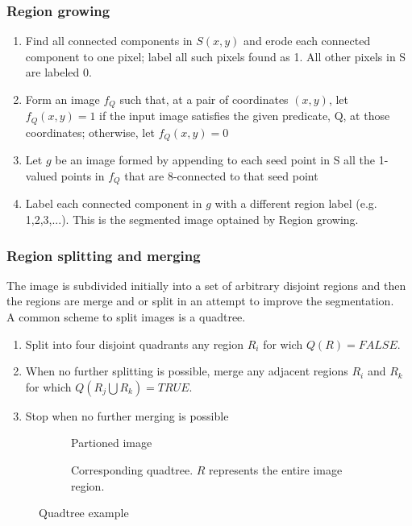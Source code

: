 \subsubsection{Region growing}
\begin{enumerate}
\item Find all connected components in $S(x,y)$ and erode each connected component to one pixel; label all such pixels found as 1. All other pixels in S are labeled 0.
\item Form an image $f_Q$ such that, at a pair of coordinates $(x,y)$, let $f_Q(x,y)=1$ if the input image satisfies the given predicate, Q, at those coordinates; otherwise, let $f_Q(x,y)=0$
\item Let $g$ be an image formed by appending to each seed point in S all the 1-valued points in $f_Q$ that are 8-connected to that seed point
\item Label each connected component in $g$ with a different region label (e.g. 1,2,3,...). This is the segmented image optained by Region growing.
\end{enumerate}
\subsubsection{Region splitting and merging}
The image is subdivided initially into a set of arbitrary disjoint regions and then the regions are merge and or split in an attempt to improve the segmentation.\\
A common scheme to split images is a quadtree.\\
\begin{enumerate}
	\item Split into four disjoint quadrants any region $R_i$ for wich $Q(R)= FALSE$. 
	\item When no further splitting is possible, merge any adjacent regions $R_i$ and $R_k$ for which $Q(R_j\bigcup R_k) = TRUE$.
	\item Stop when no further merging is possible
\end{enumerate}
\begin{figure}[h]
	\centering
	\begin{subfigure}{0.3\textwidth}
		\centering
		
		\caption{Partioned image}
	\end{subfigure}
	\begin{subfigure}{0.5\textwidth}
		\centering
		
		\caption{Corresponding quadtree. $R$ represents the entire image region.}
	\end{subfigure}
	\caption{Quadtree example}
\end{figure}


